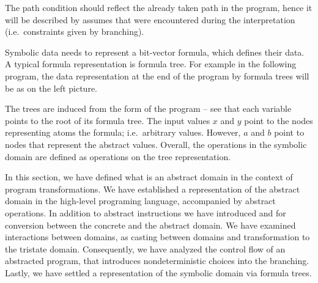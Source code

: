 The path condition should reflect the already taken path in the program, hence
it will be described by assumes that were encountered during the interpretation
(i.e.~constraints given by branching).

Symbolic data needs to represent a bit-vector formula, which defines their data.
A typical formula representation is formula tree. For example in the following program, the data representation at the end of the program by formula trees will
be as on the left picture.

\bigskip
\noindent
{}
\hfill
{}

The trees are induced from the \SSA form of the program -- see that each
variable points to the root of its formula tree. The input values $x$ and $y$
point to the nodes representing atoms the formula; i.e.~arbitrary values.
However, $a$ and $b$ point to nodes that represent the abstract values.
Overall, the operations in the symbolic domain are defined as operations on
the tree representation.

\begin{summary}
In this section, we have defined what is an abstract domain in the context of program
transformations. We have established a representation of the abstract domain in
the high-level programing language, accompanied by abstract operations. In
addition to abstract \LLVM instructions we have introduced  and
 for conversion between the concrete and the abstract domain. We have
examined interactions between domains, as casting between domains and
transformation to the tristate domain. Consequently, we have analyzed the control flow
of an abstracted program, that introduces nondeterministic choices into the
branching. Lastly, we have settled a representation of the symbolic domain via formula
trees.
\end{summary}

